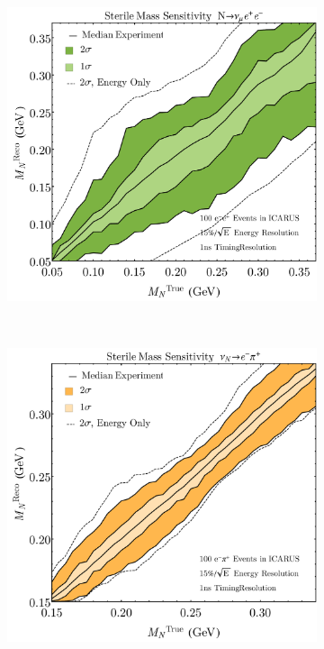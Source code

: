 \documentclass[11pt, a4paper]{article}
\begin{document}
\begin{figure}[t]
\center
\begin{subfigure}[t]{0.5\textwidth}
\includegraphics[width=\textwidth]{figures/icarus_mass_sensitivity_ee.pdf}
\end{subfigure}%
~
\begin{subfigure}[t]{0.5\textwidth} %
\includegraphics[width=\textwidth]{figures/icarus_mass_sensitivity.pdf}
\end{subfigure}


\end{figure}
\end{document}
